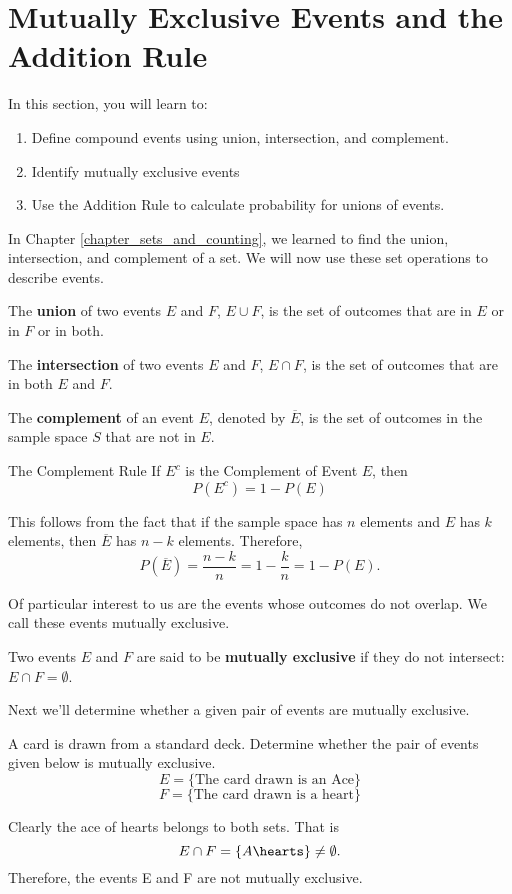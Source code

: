 \section{Mutually Exclusive Events and the Addition Rule}\label{section_mutually_exclusive_events_and_addition_rule}

In this section, you will learn to:
\begin{enumerate}
    \item Define compound events using union, intersection, and complement.
    \item Identify mutually exclusive events
    \item Use the Addition Rule to calculate probability for unions of events.
\end{enumerate}

In Chapter \ref{chapter_sets_and_counting}, we learned to find the union, intersection, and complement of a set. We will now use these set operations to describe events.

The \textbf{union} of two events \(E\) and \(F\), \(E \cup F\), is the set of outcomes that are in \(E\) or in \(F\) or in both.

The \textbf{intersection} of two events \(E\) and \(F\), \(E \cap F\), is the set of outcomes that are in both \(E\) and \(F\).

The \textbf{complement} of an event \(E\), denoted by \(\overline{E}\), is the set of outcomes in the sample space \(S\) that are not in \(E\).

\begin{summarybox}{The Complement Rule}
    If \(E^c\) is the Complement of Event \(E\), then
    \[ P(E^c) = 1 - P(E) \]
\end{summarybox}


This follows from the fact that if the sample space has \(n\) elements and \(E\) has \(k\) elements, then \(\overline{E}\) has \(n - k\) elements. Therefore,
\[
    P\left(\overline{E}\right) = \frac{n - k}{n} = 1 - \frac{k}{n} = 1 - P(E).
\]

Of particular interest to us are the events whose outcomes do not overlap. We call these events mutually exclusive.

Two events \(E\) and \(F\) are said to be \textbf{mutually exclusive} if they do not intersect: \(E \cap F = \emptyset\).

Next we'll determine whether a given pair of events are mutually exclusive.

\begin{example}
    A card is drawn from a standard deck. Determine whether the pair of events given below is mutually exclusive.
    \[ E = \{\text{The card drawn is an Ace}\} \]
    \[ F = \{\text{The card drawn is a heart}\} \]
\end{example}
\begin{solution}
    Clearly the ace of hearts belongs to both sets. That is
    \[ E \cap F = \{A\hearts\} \neq \emptyset. \]
    Therefore, the events E and F are not mutually exclusive.
\end{solution}

